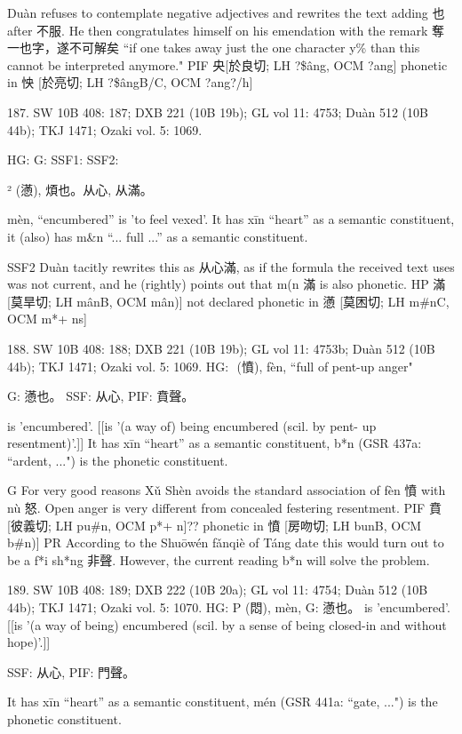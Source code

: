     Duàn refuses to contemplate negative adjectives and rewrites the text adding 也 after 不服. He then congratulates himself on his emendation with the remark 奪一也字，遂不可解矣 ``if one takes away just the one character y\% than this cannot be interpreted anymore."
PIF   央[於良切; LH ?\$âng, OCM ?ang] phonetic in 怏 [於亮切; LH ?\$ângB/C, OCM ?ang?/h]

187. SW 10B 408: 187; DXB 221 (10B 19b); GL vol 11: 4753; Duàn 512 (10B 44b); TKJ 1471; Ozaki vol. 5: 1069.


HG:
G: SSF1: SSF2:

² (懣), 煩也。从心,
从滿。


mèn, ``encumbered'' is 'to feel vexed'.
It has xīn ``heart'' as a semantic constituent,
it (also) has m&n ``... full ...'' as a semantic constituent.

SSF2 Duàn tacitly rewrites this as 从心滿, as if the formula the received text uses was not current, and he (rightly) points out that m(n 滿 is also phonetic.
HP	滿 [莫旱切;  LH mânB, OCM mân)]  not declared phonetic in 懣 [莫困切; LH m\#nC, OCM m*+ ns]


188. SW 10B 408: 188; DXB 221 (10B 19b); GL vol 11: 4753b; Duàn 512 (10B 44b); TKJ 1471; Ozaki vol. 5: 1069.
HG:  (憤), fèn, ``full of pent-up anger"

G:	懣也。
SSF: 从心,
PIF: 賁聲。

is 'encumbered'. [[is '(a way of) being encumbered (scil. by pent- up resentment)'.]]
It has xīn ``heart'' as a semantic constituent,
b*n (GSR 437a: ``ardent, ...") is the phonetic constituent.

G	For very good reasons Xǔ Shèn avoids the standard association of fèn 憤 with nù 怒. Open anger is very different from concealed festering resentment.
PIF     賁[彼義切; LH pu\#n, OCM p*+ n]?? phonetic in 憤 [房吻切; LH bunB, OCM b\#n)]
PR	According to the Shuōwén fǎnqiè of Táng date this would turn out to be a f*i sh*ng 非聲. However, the current reading b*n will solve the problem.


189. SW 10B 408: 189; DXB 222 (10B 20a); GL vol 11: 4754; Duàn 512 (10B 44b); TKJ 1471; Ozaki vol. 5: 1070.
HG: P (悶), mèn,
G:	懣也。	is 'encumbered'. [[is '(a way of being) encumbered (scil. by a sense of being closed-in and without hope)'.]]




SSF: 从心,
PIF: 門聲。

It has xīn ``heart'' as a semantic constituent,
mén (GSR 441a: ``gate, ...") is the phonetic constituent.

